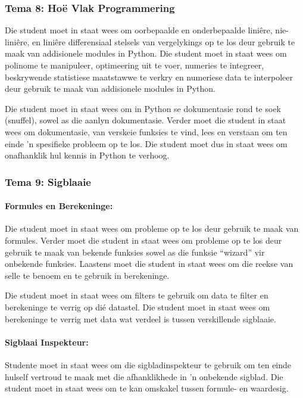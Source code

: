         
        \subsubsection{Tema 8: Ho\"{e} Vlak Programmering}
            Die student moet in staat wees om oorbepaalde en onderbepaalde 
            lini\^{e}re, nie-lini\^{e}re, en lini\^{e}re differensiaal stelsels van vergelykings op te los
            deur gebruik te maak van addisionele modules in Python. Die student
            moet in staat wees om polinome te manipuleer, optimeering uit te voer, 
            numeries te integreer, beskrywende statistiese maatstawwe te verkry
            en numeriese data te interpoleer deur gebruik te maak 
            van addisionele modules in Python.
                
            Die student moet in staat wees om in Python se dokumentasie
            rond te soek (snuffel), sowel as die aanlyn dokumentasie. 
            Verder moet die student in staat wees om dokumentasie, van verskeie funksies
            te vind, lees en verstaan om ten einde
            'n spesifieke probleem op te los.  Die student moet dus in staat wees 
            om onafhanklik hul kennis in Python te verhoog.

        \subsubsection{Tema 9: Sigblaaie}
            \paragraph{Formules en Berekeninge:}
                Die student moet in staat wees om probleme op te los deur gebruik 
                te maak van formules. Verder moet die student in staat wees om probleme
                op te los deur gebruik te maak van bekende funksies sowel as die
                funksie ``wizard'' vir onbekende funksies.  Laastens moet die student in staat
                wees om die reekse van selle te benoem en te gebruik in berekeninge.
                
		Die student moet in staat wees om filters te gebruik om data te filter
		en berekeninge te verrig op di\'{e} datastel.  Die student
		moet in staat wees om berekeninge te verrig met data wat verdeel is
		tussen verskillende sigblaaie.
		
            \paragraph{Sigblaai Inspekteur:}
		Studente moet in staat wees om die sigbladinspekteur te gebruik
		om ten einde hulself vertroud te maak met die afhanklikhede in 'n 
		onbekende sigblad.  Die student moet in staat wees om te kan omskakel 
		tussen formule- en waardesig.
  
